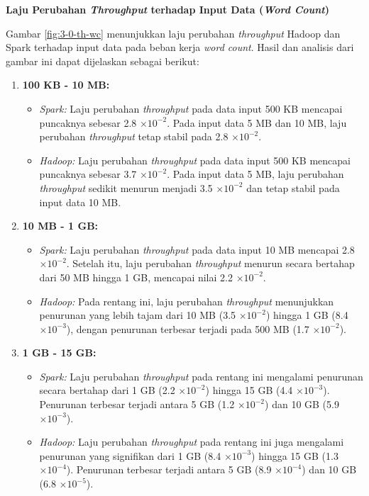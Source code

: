 \textbf{Laju Perubahan \textit{Throughput} terhadap Input Data (\textit{Word Count})}

Gambar \ref{fig:3-0-th-wc} menunjukkan laju perubahan \textit{throughput} Hadoop dan Spark terhadap input data pada beban kerja \textit{word count}. Hasil dan analisis dari gambar ini dapat dijelaskan sebagai berikut:

\begin{enumerate}
\item \textbf{100 KB - 10 MB:}
\begin{itemize}
\item \textit{Spark:} Laju perubahan \textit{throughput} pada data input 500 KB mencapai puncaknya sebesar 2.8 $\times 10^{-2}$. Pada input data 5 MB dan 10 MB, laju perubahan \textit{throughput} tetap stabil pada 2.8 $\times 10^{-2}$.
\item \textit{Hadoop:} Laju perubahan \textit{throughput} pada data input 500 KB mencapai puncaknya sebesar 3.7 $\times 10^{-2}$. Pada input data 5 MB, laju perubahan \textit{throughput} sedikit menurun menjadi 3.5 $\times 10^{-2}$ dan tetap stabil pada input data 10 MB.
\end{itemize}
\item \textbf{10 MB - 1 GB:}
\begin{itemize}
\item \textit{Spark:} Laju perubahan \textit{throughput} pada data input 10 MB mencapai 2.8 $\times 10^{-2}$. Setelah itu, laju perubahan \textit{throughput} menurun secara bertahap dari 50 MB hingga 1 GB, mencapai nilai 2.2 $\times 10^{-2}$.
\item \textit{Hadoop:} Pada rentang ini, laju perubahan \textit{throughput} menunjukkan penurunan yang lebih tajam dari 10 MB (3.5 $\times 10^{-2}$) hingga 1 GB (8.4 $\times 10^{-3}$), dengan penurunan terbesar terjadi pada 500 MB (1.7 $\times 10^{-2}$).
\end{itemize}

\item \textbf{1 GB - 15 GB:}
\begin{itemize}
\item \textit{Spark:} Laju perubahan \textit{throughput} pada rentang ini mengalami penurunan secara bertahap dari 1 GB (2.2 $\times 10^{-2}$) hingga 15 GB (4.4 $\times 10^{-3}$). Penurunan terbesar terjadi antara 5 GB (1.2 $\times 10^{-2}$) dan 10 GB (5.9 $\times 10^{-3}$).
\item \textit{Hadoop:} Laju perubahan \textit{throughput} pada rentang ini juga mengalami penurunan yang signifikan dari 1 GB (8.4 $\times 10^{-3}$) hingga 15 GB (1.3 $\times 10^{-4}$). Penurunan terbesar terjadi antara 5 GB (8.9 $\times 10^{-4}$) dan 10 GB (6.8 $\times 10^{-5}$).
\end{itemize}
\end{enumerate}

